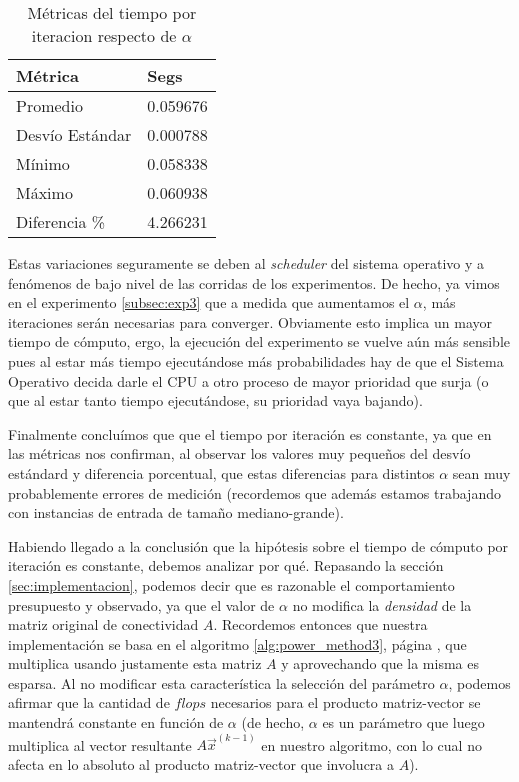\begin{table}[H]
    \centering
    \caption{Métricas del tiempo por iteracion respecto de $\alpha$}
    \label{tbl:exp4_data_notredame} 
    \setlength{\tabcolsep}{3pt}
    \begin{tabular}{|l|l|}
        \hline
        Métrica & Segs\\
        \hline\hline
        Promedio & 0.059676\\
        Desv\'io Est\'andar & 0.000788\\
        M\'inimo & 0.058338\\
        M\'aximo & 0.060938\\
        Diferencia \%\footnotemark& 4.266231\\
        \hline
    \end{tabular}
\end{table}


\par Estas variaciones seguramente se deben al \emph{scheduler} del sistema
operativo y a fenómenos de bajo nivel de las corridas de los
experimentos. De hecho, ya vimos en el experimento \ref{subsec:exp3} que a
medida que aumentamos el $\alpha$, m\'as iteraciones ser\'an necesarias para
converger. Obviamente esto implica un mayor tiempo de c\'omputo, ergo, la
ejecuci\'on del experimento se vuelve a\'un m\'as sensible pues al estar m\'as
tiempo ejecut\'andose m\'as probabilidades hay de que el Sistema Operativo
decida darle el CPU a otro proceso de mayor prioridad que surja (o que al estar
tanto tiempo ejecut\'andose, su prioridad vaya bajando).

\par Finalmente conclu\'imos que que el tiempo por iteraci\'on es constante, ya
que en las m\'etricas nos confirman, al observar los valores muy peque\~nos del
desv\'io est\'andard y diferencia porcentual, que estas diferencias para
distintos $\alpha$ sean muy probablemente errores de medici\'on (recordemos que
adem\'as estamos trabajando con instancias de entrada de tama\~no
mediano-grande).

\par Habiendo llegado a la conclusi\'on que la hip\'otesis sobre el tiempo de
c\'omputo por iteraci\'on es constante, debemos analizar por qu\'e. Repasando la
secci\'on \ref{sec:implementacion}, podemos decir que es razonable el
comportamiento presupuesto y observado, ya que el valor de $\alpha$ no modifica
la \emph{densidad} de la matriz original de conectividad $A$. Recordemos
entonces que nuestra implementaci\'on se basa en el algoritmo
\ref{alg:power_method3}, p\'agina \pageref{alg:power_method3}, que multiplica
usando justamente esta matriz $A$ y aprovechando que la misma es esparsa. Al no
modificar esta caracter\'istica la selecci\'on del par\'ametro $\alpha$, podemos
afirmar que la cantidad de $flops$ necesarios para el producto matriz-vector se
mantendr\'a constante en funci\'on de $\alpha$ (de hecho, $\alpha$ es un
par\'ametro que luego multiplica al vector resultante $A\vec{x}^{(k-1)}$ en
nuestro algoritmo, con lo cual no afecta en lo absoluto al producto
matriz-vector que involucra a $A$).

